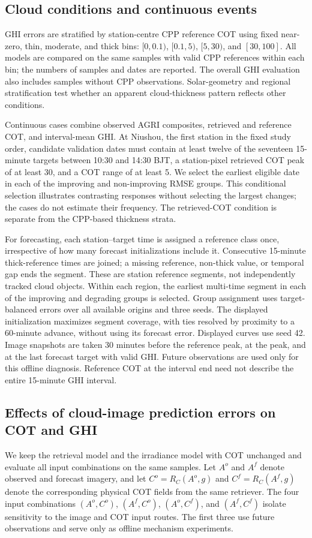 \documentclass[11pt]{article}
\begin{document}
\subsection{Cloud conditions and continuous events}
GHI errors are stratified by station-centre CPP reference COT using fixed near-zero, thin, moderate, and thick bins: $[0,0.1)$, $[0.1,5)$, $[5,30)$, and $[30,100]$. All models are compared on the same samples with valid CPP references within each bin; the numbers of samples and dates are reported. The overall GHI evaluation also includes samples without CPP observations. Solar-geometry and regional stratification test whether an apparent cloud-thickness pattern reflects other conditions.

Continuous cases combine observed AGRI composites, retrieved and reference COT, and interval-mean GHI. At Niushou, the first station in the fixed study order, candidate validation dates must contain at least twelve of the seventeen 15-minute targets between 10:30 and 14:30 BJT, a station-pixel retrieved COT peak of at least 30, and a COT range of at least 5. We select the earliest eligible date in each of the improving and non-improving RMSE groups. This conditional selection illustrates contrasting responses without selecting the largest changes; the cases do not estimate their frequency. The retrieved-COT condition is separate from the CPP-based thickness strata.

For forecasting, each station--target time is assigned a reference class once, irrespective of how many forecast initializations include it. Consecutive 15-minute thick-reference times are joined; a missing reference, non-thick value, or temporal gap ends the segment. These are station reference segments, not independently tracked cloud objects. Within each region, the earliest multi-time segment in each of the improving and degrading groups is selected. Group assignment uses target-balanced errors over all available origins and three seeds. The displayed initialization maximizes segment coverage, with ties resolved by proximity to a 60-minute advance, without using its forecast error. Displayed curves use seed 42. Image snapshots are taken 30 minutes before the reference peak, at the peak, and at the last forecast target with valid GHI. Future observations are used only for this offline diagnosis. Reference COT at the interval end need not describe the entire 15-minute GHI interval.

\subsection{Effects of cloud-image prediction errors on COT and GHI}
We keep the retrieval model and the irradiance model with COT unchanged and evaluate all input combinations on the same samples. Let $A^o$ and $A^f$ denote observed and forecast imagery, and let $C^o=R_C(A^o,g)$ and $C^f=R_C(A^f,g)$ denote the corresponding physical COT fields from the same retriever. The four input combinations $(A^o,C^o)$, $(A^f,C^o)$, $(A^o,C^f)$, and $(A^f,C^f)$ isolate sensitivity to the image and COT input routes. The first three use future observations and serve only as offline mechanism experiments.
\end{document}

